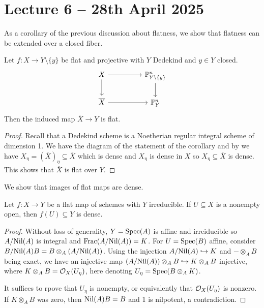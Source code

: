 \section{Lecture 6 -- 28th April 2025}\label{sec: lecture 6}
As a corollary of the previous discussion about flatness, we show that flatness can be extended over a closed fiber. 
\begin{corollary}\label{corr: properness of the hilbert scheme}
    Let $f:X\to Y\setminus\{y\}$ be flat and projective with $Y$ Dedekind and $y\in Y$ closed. 
    $$%
    \begin{tikzcd}
        X && {\PP^{n}_{Y\setminus \{y\}}} \\
        {\overline{X}} && {\PP^{n}_{Y}}
        \arrow[from=1-1, to=1-3]
        \arrow[from=1-1, to=2-1]
        \arrow[from=1-3, to=2-3]
        \arrow[from=2-1, to=2-3]
    \end{tikzcd}$$
    Then the induced map $\overline{X}\to Y$ is flat. 
\end{corollary}
\begin{proof}
    Recall that a Dedekind scheme is a Noetherian regular integral scheme of dimension 1. We have the diagram of the statement of the corollary and by  we have $X_{\eta}=(\overline{X})_{\eta}\subseteq\overline{X}$ which is dense and $X_{\eta}$ is dense in $X$ so $X_{\eta}\subseteq \overline{X}$ is dense. This shows that $\overline{X}$ is flat over $Y$. 
\end{proof}
We show that images of flat maps are dense. 
\begin{proposition}\label{prop: flat implies dense image}
    Let $f:X\to Y$ be a flat map of schemes with $Y$ irreducible. If $U\subseteq X$ is a nonempty open, then $f(U)\subseteq Y$ is dense. 
\end{proposition}
\begin{proof}
    Without loss of generality, $Y=\operatorname{Spec}(A)$ is affine and irreiducible so $A/\mathrm{Nil}(A)$ is integral and $\mathrm{Frac}(A/\mathrm{Nil}(A))=K$. For $U=\operatorname{Spec}(B)$ affine, consider $B/\mathrm{Nil}(A)B=B\otimes_{A}(A/\mathrm{Nil}(A))$. Using the injection $A/\mathrm{Nil}(A)\hookrightarrow K$ and $-\otimes_{A}B$ being exact, we have an injective map $(A/\mathrm{Nil}(A))\otimes_{A}B\hookrightarrow K\otimes_{A}B$ injective, where $K\otimes_{A}B=\mathcal{O}_{X}(U_{\eta})$, here denoting $U_{\eta}=\operatorname{Spec}(B\otimes_{A}K)$. 

    It suffices to rpove that $U_{\eta}$ is nonempty, or equivalently that $\mathcal{O}_{X}(U_{\eta})$ is nonzero. If $K\otimes_{A}B$ was zero, then $\mathrm{Nil}(A)B=B$ and 1 is nilpotent, a contradiction. 
\end{proof}
